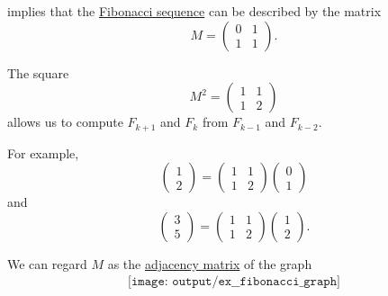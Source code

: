 \begin{example}\label{ex:fibonacci_matrix}
   implies that the \hyperref[def:fibonacci_number]{Fibonacci sequence} can be described by the matrix
  \begin{equation*}
    M
    =
    \begin{pmatrix}
      0 & 1 \\
      1 & 1
    \end{pmatrix}.
  \end{equation*}

  \begin{thmenum}
     The square
    \begin{equation*}
      M^2
      =
      \begin{pmatrix}
        1 & 1 \\
        1 & 2
      \end{pmatrix}
    \end{equation*}
    allows us to compute \( F_{k+1} \) and \( F_k \) from \( F_{k-1} \) and \( F_{k-2} \).

    For example,
    \begin{equation*}
      \begin{pmatrix}
        1 \\ 2
      \end{pmatrix}
      =
      \begin{pmatrix}
        1 & 1 \\
        1 & 2
      \end{pmatrix}
      \begin{pmatrix}
        0 \\ 1
      \end{pmatrix}
    \end{equation*}
    and
    \begin{equation*}
      \begin{pmatrix}
        3 \\ 5
      \end{pmatrix}
      =
      \begin{pmatrix}
        1 & 1 \\
        1 & 2
      \end{pmatrix}
      \begin{pmatrix}
        1 \\ 2
      \end{pmatrix}.
    \end{equation*}

     We can regard \( M \) as the \hyperref[def:adjacency_matrix]{adjacency matrix} of the graph
    \begin{equation}\label{eq:ex:fibonacci_matrix/graph}
      \begin{aligned}
        \texttt{[image: output/ex\_\_fibonacci\_graph]}
      \end{aligned}
    \end{equation}


\end{thmenum}
\end{example}
